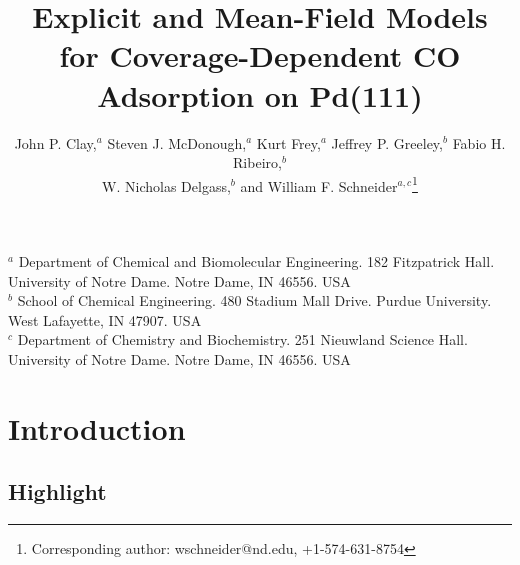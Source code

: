 \documentclass[11pt]{article}
\begin{document}
\linenumbers
\doublespacing

\title{Explicit and Mean-Field Models for Coverage-Dependent CO Adsorption on Pd(111)}

\author{John P. Clay,$^{a}$ Steven J. McDonough,$^{a}$ Kurt Frey,$^{a}$ Jeffrey P. Greeley,$^{b}$ Fabio H. Ribeiro,$^{b}$ \\ W. Nicholas Delgass,$^{b}$ and William F. Schneider$^{a,c}$\footnote{Corresponding author: wschneider@nd.edu, +1-574-631-8754}} 
\date{}
\maketitle
\noindent
{$^{a}$ Department of Chemical and Biomolecular Engineering. 
	        182 Fitzpatrick Hall. University of Notre Dame. Notre Dame, IN 46556. USA}\\
{$^{b}$ School of Chemical Engineering.
			480 Stadium Mall Drive. Purdue University. West Lafayette, IN 47907. USA}\\
{$^{c}$ Department of Chemistry and Biochemistry. 
			251 Nieuwland Science Hall. University of Notre Dame. Notre Dame, IN 46556.
			USA}\\

\newpage

\section*{Introduction}
\label{intro}
\subsection*{Highlight}
\label{highl}

\end{document}
